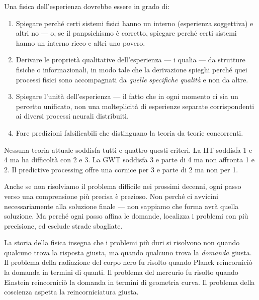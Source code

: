 \documentclass[12pt,a4paper,openany]{book}
\newcommand{\sezione}[1]{\vspace{1.2em}{\large\bfseries #1}\vspace{0.5em}\par}
\begin{document}
\sezione{Cosa dovrebbe fare una fisica dell'esperienza}

Una fisica dell'esperienza dovrebbe essere in grado di:

\begin{enumerate}
\item Spiegare perché certi sistemi fisici hanno un interno (esperienza soggettiva) e altri no --- o, se il panpsichismo è corretto, spiegare perché certi sistemi hanno un interno ricco e altri uno povero.

\item Derivare le proprietà qualitative dell'esperienza --- i qualia --- da strutture fisiche o informazionali, in modo tale che la derivazione spieghi perché quei processi fisici sono accompagnati da \textit{quelle specifiche qualità} e non da altre.

\item Spiegare l'unità dell'esperienza --- il fatto che in ogni momento ci sia un percetto unificato, non una molteplicità di esperienze separate corrispondenti ai diversi processi neurali distribuiti.

\item Fare predizioni falsificabili che distinguano la teoria da teorie concorrenti.
\end{enumerate}

Nessuna teoria attuale soddisfa tutti e quattro questi criteri. La IIT soddisfa 1 e 4 ma ha difficoltà con 2 e 3. La GWT soddisfa 3 e parte di 4 ma non affronta 1 e 2. Il predictive processing offre una cornice per 3 e parte di 2 ma non per 1.

\sezione{Il significato del progresso}

Anche se non risolviamo il problema difficile nei prossimi decenni, ogni passo verso una comprensione più precisa è prezioso. Non perché ci avvicini necessariamente alla soluzione finale --- non sappiamo che forma avrà quella soluzione. Ma perché ogni passo affina le domande, localizza i problemi con più precisione, ed esclude strade sbagliate.

La storia della fisica insegna che i problemi più duri si risolvono non quando qualcuno trova la risposta giusta, ma quando qualcuno trova la \textit{domanda} giusta. Il problema della radiazione del corpo nero fu risolto quando Planck reincorniciò la domanda in termini di quanti. Il problema del mercurio fu risolto quando Einstein reincorniciò la domanda in termini di geometria curva. Il problema della coscienza aspetta la reincorniciatura giusta.
\end{document}
